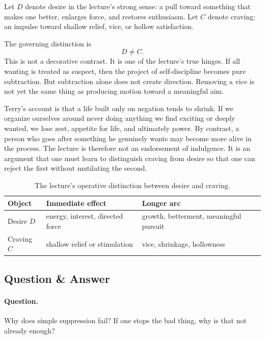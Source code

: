 \begin{definition}
Let \(D\) denote desire in the lecture's strong sense: a pull toward something that makes one better, enlarges force, and restores enthusiasm. Let \(C\) denote craving: an impulse toward shallow relief, vice, or hollow satisfaction.
\end{definition}

The governing distinction is
\begin{equation}
D \neq C.
\end{equation}
This is not a decorative contrast. It is one of the lecture's true hinges. If all wanting is treated as suspect, then the project of self-discipline becomes pure subtraction. But subtraction alone does not create direction. Removing a vice is not yet the same thing as producing motion toward a meaningful aim.

Terry's account is that a life built only on negation tends to shrink. If we organize ourselves around never doing anything we find exciting or deeply wanted, we lose zest, appetite for life, and ultimately power. By contrast, a person who goes after something he genuinely wants may become more alive in the process. The lecture is therefore not an endorsement of indulgence. It is an argument that one must learn to distinguish craving from desire so that one can reject the first without mutilating the second.

\begin{table}[h]
\centering
\begin{tabular}{|l|l|l|}
\hline
Object & Immediate effect & Longer arc \\
\hline
Desire \(D\) & energy, interest, directed force & growth, betterment, meaningful pursuit \\
\hline
Craving \(C\) & shallow relief or stimulation & vice, shrinkage, hollowness \\
\hline
\end{tabular}
\caption{The lecture's operative distinction between desire and craving.}
\end{table}

\subsection{Question \& Answer}

\paragraph{Question.} Why does simple suppression fail? If one stops the bad thing, why is that not already enough?

